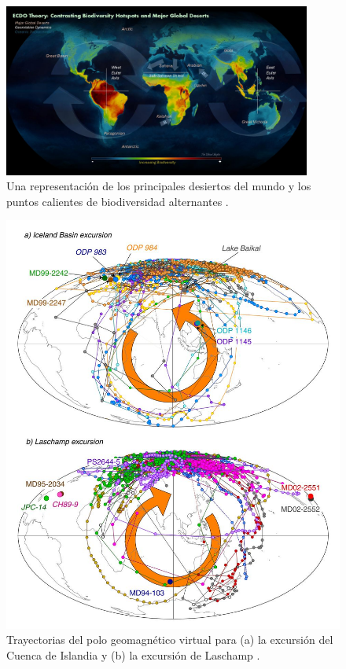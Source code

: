 \documentclass[10pt,twocolumn,letterpaper]{article}
\begin{document}
\begin{figure}[t]
\begin{center}
\includegraphics[width=0.9\textwidth]{biodiversity.jpg}
\end{center}
   \caption{Una representación de los principales desiertos del mundo y los puntos calientes de biodiversidad alternantes \cite{28}.}
\label{fig:9}
\end{figure}

\begin{figure}[t]
\begin{center}
   \includegraphics[width=0.95\linewidth]{laj.jpg}
\end{center}
   \caption{Trayectorias del polo geomagnético virtual para (a) la excursión del Cuenca de Islandia y (b) la excursión de Laschamp \cite{35}.}
\label{fig:7}
\label{fig:onecol}
\end{figure}
\end{document}
